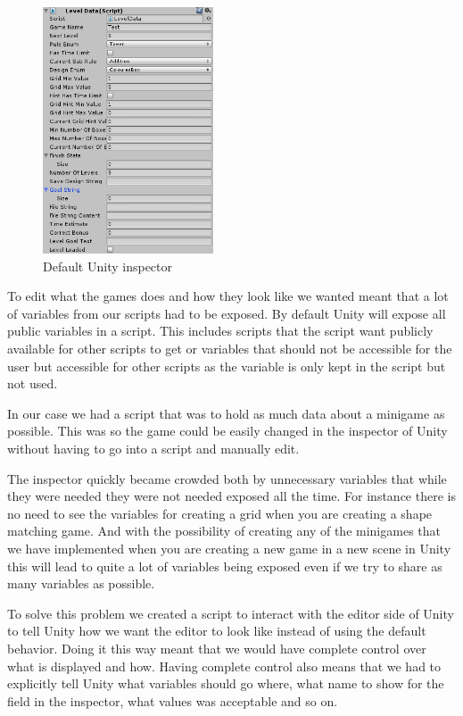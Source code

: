 \begin{figure}
	\capstart
	\includegraphics[width=0.45\textwidth]{images/inspector.png}
	\caption{Default Unity inspector}
\end{figure}

To edit what the games does and how they look like we wanted meant that a lot of variables from our scripts had to be exposed.
By default Unity will expose all public variables in a script.
This includes scripts that the script want publicly available for other scripts to get or variables that should not be accessible for the
user but accessible for other scripts as the variable is only kept in the script but not used.

In our case we had a script that was to hold as much data about a minigame as possible.
This was so the game could be easily changed in the inspector of Unity without having to go into a script and manually edit.

The inspector quickly became crowded both by unnecessary variables that while they were needed they were not needed exposed all the time.
For instance there is no need to see the variables for creating a grid when you are creating a shape matching game.
And with the possibility of creating any of the minigames that we have implemented when you are creating a new game in a new scene in Unity 
this will lead to quite a lot of variables being exposed even if we try to share as many variables as possible.

To solve this problem we created a script to interact with the editor side of Unity to tell Unity how we
want the editor to look like instead of using the default behavior.
Doing it this way meant that we would have complete control over what is displayed and how.
Having complete control also means that we had to explicitly tell Unity what variables should go where, what name to show
for the field in the inspector, what values was acceptable and so on. 


